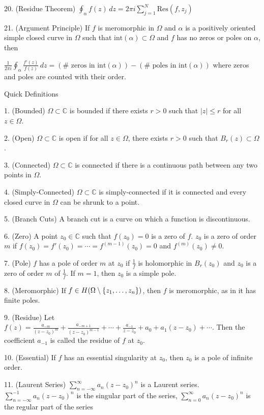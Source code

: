 \documentclass[10pt]{article}
\makeatletter
\newcommand{\set}[1]{\left\{#1\right\}}
\let\originalleft\left
\let\originalright\right
\renewcommand{\left}{\mathopen{}\mathclose\bgroup\originalleft}
\renewcommand{\right}{\aftergroup\egroup\originalright}
\renewcommand{\section}{\@startsection{section}{1}{0ex}{-1ex}{0.7ex}
                        {\normalfont\large\bfseries}}
\newcommand{\C}{\mathbb C}
\newcommand{\Om}{\Omega}
\newcommand{\Res}{\text{Res}}
\makeatother
\begin{document}
20. (Residue Theorem) $\oint_\alpha f(z)\,dz=2\pi i\sum_{j=1}^N \Res(f,z_j)$

21. (Argument Principle) If $f$ is meromorphic in $\Omega$ and $\alpha$ is a positively oriented simple closed curve in $\Omega$ such that $\text{int}(\alpha)\subset\Omega$ and $f$ has no zeros or poles on $\alpha$, then

\hspace{1.4em} $\frac{1}{2\pi i}\oint_\alpha \frac{f'(z)}{f(z)}\,dz=(\#\text{ zeros in int}(\alpha))-(\#\text{ poles in int}(\alpha))$ where zeros and poles are counted with their order.

\section{Quick Definitions}

1. (Bounded) $\Om\subset\C$ is bounded if there exists $r>0$ such that $|z|\le r$ for all $z\in\Om$. 

2. (Open) $\Om\subset\C$ is open if for all $z\in\Om$, there exists $r>0$ such that $B_r(z)\subset\Om$.

3. (Connected) $\Om\subset\C$ is connected if there is a continuous path between any two points in $\Om$.

4. (Simply-Connected) $\Om\subset\C$ is simply-connected if it is connected and every closed curve in $\Om$ can be shrunk to a point. 

5. (Branch Cuts) A branch cut is a curve on which a function is discontinuous. 

6. (Zero) A point $z_0\in\C$ such that $f(z_0)=0$ is a zero of $f$. $z_0$ is a zero of order $m$ if $f(z_0)=f'(z_0)=\cdots=f^{(m-1)}(z_0)=0$ and $f^{(m)}(z_0)\ne 0$.

7. (Pole) $f$ has a pole of order $m$ at $z_0$ if $\frac 1f$ is holomorphic in $B_r(z_0)$ and $z_0$ is a zero of order $m$ of $\frac 1f$. If $m=1$, then $z_0$ is a simple pole.

8. (Meromorphic) If $f\in H(\Om\setminus\set{z_1,\ldots,z_n})$, then $f$ is meromorphic, as in it has finite poles. 

9. (Residue) Let $f(z)=\frac{a_{-m}}{(z-z_0)^m}+\frac{a_{-m+1}}{(z-z_0)^{m-1}}+\cdots+\frac{a_{-1}}{z-z_0}+a_0+a_1(z-z_0)+\cdots$. Then the coefficient $a_{-1}$ is called the residue of $f$ at $z_0$.

10. (Essential) If $f$ has an essential singularity at $z_0$, then $z_0$ is a pole of infinite order. 

11. (Laurent Series) $\sum_{n=-\infty}^\infty a_n(z-z_0)^n$ is a Laurent series. $\sum_{n=-\infty}^{-1}a_n(z-z_0)^n$ is the singular part of the series, $\sum_{n=0}^\infty a_n(z-z_0)^n$ is the regular part of the series
\end{document}
